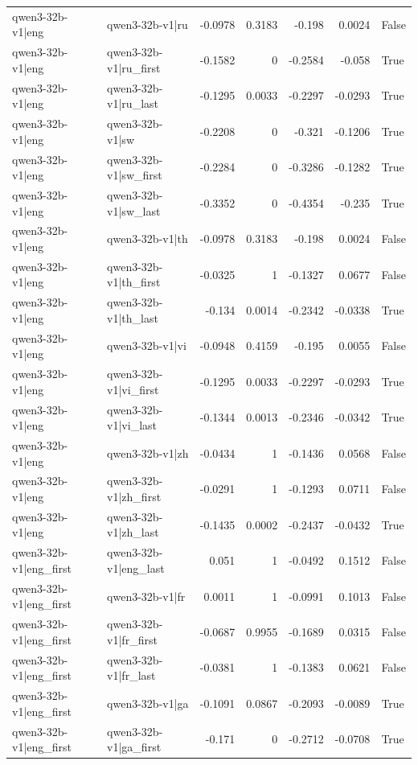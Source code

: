 \begin{table}
\begin{tabular}{l l r r r r l}
qwen3-32b-v1|eng & qwen3-32b-v1|ru & -0.0978 & 0.3183 & -0.198 & 0.0024 & False \\
qwen3-32b-v1|eng & qwen3-32b-v1|ru_first & -0.1582 & 0 & -0.2584 & -0.058 & True \\
qwen3-32b-v1|eng & qwen3-32b-v1|ru_last & -0.1295 & 0.0033 & -0.2297 & -0.0293 & True \\
qwen3-32b-v1|eng & qwen3-32b-v1|sw & -0.2208 & 0 & -0.321 & -0.1206 & True \\
qwen3-32b-v1|eng & qwen3-32b-v1|sw_first & -0.2284 & 0 & -0.3286 & -0.1282 & True \\
qwen3-32b-v1|eng & qwen3-32b-v1|sw_last & -0.3352 & 0 & -0.4354 & -0.235 & True \\
qwen3-32b-v1|eng & qwen3-32b-v1|th & -0.0978 & 0.3183 & -0.198 & 0.0024 & False \\
qwen3-32b-v1|eng & qwen3-32b-v1|th_first & -0.0325 & 1 & -0.1327 & 0.0677 & False \\
qwen3-32b-v1|eng & qwen3-32b-v1|th_last & -0.134 & 0.0014 & -0.2342 & -0.0338 & True \\
qwen3-32b-v1|eng & qwen3-32b-v1|vi & -0.0948 & 0.4159 & -0.195 & 0.0055 & False \\
qwen3-32b-v1|eng & qwen3-32b-v1|vi_first & -0.1295 & 0.0033 & -0.2297 & -0.0293 & True \\
qwen3-32b-v1|eng & qwen3-32b-v1|vi_last & -0.1344 & 0.0013 & -0.2346 & -0.0342 & True \\
qwen3-32b-v1|eng & qwen3-32b-v1|zh & -0.0434 & 1 & -0.1436 & 0.0568 & False \\
qwen3-32b-v1|eng & qwen3-32b-v1|zh_first & -0.0291 & 1 & -0.1293 & 0.0711 & False \\
qwen3-32b-v1|eng & qwen3-32b-v1|zh_last & -0.1435 & 0.0002 & -0.2437 & -0.0432 & True \\
qwen3-32b-v1|eng_first & qwen3-32b-v1|eng_last & 0.051 & 1 & -0.0492 & 0.1512 & False \\
qwen3-32b-v1|eng_first & qwen3-32b-v1|fr & 0.0011 & 1 & -0.0991 & 0.1013 & False \\
qwen3-32b-v1|eng_first & qwen3-32b-v1|fr_first & -0.0687 & 0.9955 & -0.1689 & 0.0315 & False \\
qwen3-32b-v1|eng_first & qwen3-32b-v1|fr_last & -0.0381 & 1 & -0.1383 & 0.0621 & False \\
qwen3-32b-v1|eng_first & qwen3-32b-v1|ga & -0.1091 & 0.0867 & -0.2093 & -0.0089 & True \\
qwen3-32b-v1|eng_first & qwen3-32b-v1|ga_first & -0.171 & 0 & -0.2712 & -0.0708 & True \\

\end{tabular}
\end{table}
